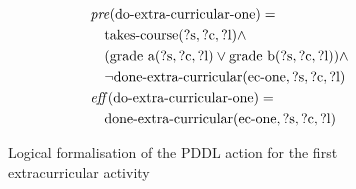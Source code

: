 \begin{figure}[t]
  \small  %
  \begin{align*}
  &\mathit{pre}(\text{do-extra-curricular-one}) = \\
  &\quad \text{takes-course}(\text{?s}, \text{?c}, \text{?l}) \land \\
  &\quad (\text{grade a}(\text{?s}, \text{?c}, \text{?l}) \lor \text{grade b}(\text{?s}, \text{?c}, \text{?l})) \land \\
  &\quad \lnot \text{done-extra-curricular}(\text{ec-one}, \text{?s}, \text{?c}, \text{?l}) \\
  &\mathit{eff}(\text{do-extra-curricular-one}) = \\
  &\quad \text{done-extra-curricular}(\text{ec-one}, \text{?s}, \text{?c}, \text{?l})
  \end{align*}
  \caption{Logical formalisation of the PDDL action for the first extracurricular activity}\label{fig:extra-curricular-one}
\end{figure}